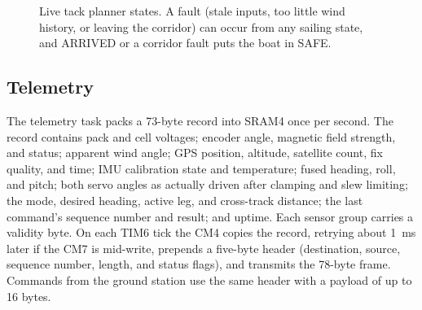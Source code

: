 \begin{figure}[!t]
\centering
{}
\caption{Live tack planner states. A fault (stale inputs, too little wind
history, or leaving the corridor) can occur from any sailing state, and
ARRIVED or a corridor fault puts the boat in SAFE.}
\label{fig:fsm}
\end{figure}

\subsection{Telemetry}
The telemetry task packs a 73-byte record into SRAM4 once per second. The
record contains pack and cell voltages; encoder angle, magnetic field
strength, and status; apparent wind angle; GPS position, altitude, satellite
count, fix quality, and time; IMU calibration state and temperature; fused
heading, roll, and pitch; both servo angles as actually driven after clamping
and slew limiting; the mode, desired heading, active leg, and cross-track
distance; the last command's sequence number and result; and uptime. Each
sensor group carries a validity byte. On each TIM6 tick the CM4 copies the
record, retrying about \SI{1}{\milli\second} later if the CM7 is mid-write,
prepends a five-byte header (destination, source, sequence number, length,
and status flags), and transmits the 78-byte frame. Commands from the ground
station use the same header with a payload of up to 16 bytes.

